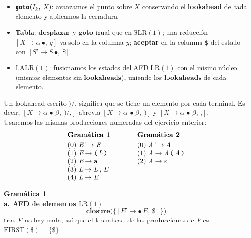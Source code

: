 \documentclass[12pt,letterpaper]{article}
\newcommand{\nt}[1]{\textit{#1}}
\newcommand{\tk}[1]{\texttt{#1}}
\newcommand{\First}[1]{\mathrm{FIRST}(#1)}
\newcommand{\lr}{\mathrm{LR(1)}}
\newcommand{\slr}{\mathrm{SLR(1)}}
\newcommand{\lalr}{\mathrm{LALR(1)}}
\newcommand{\eps}{\varepsilon}
\begin{document}
\begin{enumerate}[label=\arabic*.]
\begin{itemize}
  \item \textbf{\texttt{goto}($I_k$, $X$)}: avanzamos el punto sobre $X$ conservando el \textbf{lookahead} de
    cada elemento y aplicamos la cerradura.
    
  \item \textbf{Tabla}: \textbf{desplazar} y \textbf{goto} igual que en $\slr$; una reducción
    $[\nt{X}\to\alpha\,\bullet,\ y]$ va solo en la columna $y$; \textbf{aceptar} en la columna \tk{\$} del
    estado con $[\nt{S'}\to\nt{S}\,\bullet,\ \tk{\$}]$.
    
  \item $\lalr$: fusionamos los estados del AFD $\lr$ con el mismo núcleo (mismos elementos sin
    \textbf{lookaheads}), uniendo los \textbf{lookaheads} de cada elemento.
  \end{itemize}

  Un lookahead escrito $\tk{)}/\tk{,}$ significa que se tiene un elemento por cada terminal. Es decir,
  $[\nt{X}\to\alpha\,\bullet\,\beta,\ \tk{)}/\tk{,}]$ abrevia $[\nt{X}\to\alpha\,\bullet\,\beta,\ \tk{)}]$ y
  $[\nt{X}\to\alpha\,\bullet\,\beta,\ \tk{,}]$.\\
 
  Usaremos las mismas producciones numeradas del ejercicio anterior:
  \[
  \begin{array}{l@{\qquad\qquad}l}
    \textbf{Gramática 1} & \textbf{Gramática 2} \\[3pt]
    (0)\ \nt{E'} \to \nt{E} & (0)\ \nt{A'} \to \nt{A} \\
    (1)\ \nt{E} \to \tk{(}\,\nt{L}\,\tk{)} & (1)\ \nt{A} \to \nt{A}\,\tk{(}\,\nt{A}\,\tk{)} \\
    (2)\ \nt{E} \to \tk{a} & (2)\ \nt{A} \to \eps \\
    (3)\ \nt{L} \to \nt{L}\,\tk{,}\,\nt{E} & \\
    (4)\ \nt{L} \to \nt{E} &
  \end{array}
  \]

  
  \bigskip
  \bigskip

  
  \textbf{\Large Gramática 1}\\

  \textbf{\large a. AFD de elementos $\lr$}\\
  \[
  \textbf{closure}\big(\{[\nt{E'}\to\bullet\,\nt{E},\ \tk{\$}]\}\big)
  \]
  tras \nt{E} no hay nada, así que el lookahead de las producciones de \nt{E} es $\First{\tk{\$}}=\{\tk{\$}\}$.

  \medskip


\end{enumerate}
\end{document}

